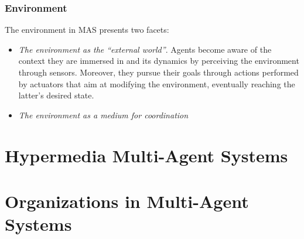 \subsubsection{Environment}
The environment in MAS presents two facets:
\begin{itemize}
    \item \textit{The environment as the ``external world''}.
    Agents become aware of the context they are immersed in and its dynamics by perceiving the environment through sensors.
    Moreover, they pursue their goals through actions performed by actuators that aim at modifying the environment, eventually reaching the latter's desired state.
    \item \textit{The environment as a medium for coordination}
\end{itemize}

\section{Hypermedia Multi-Agent Systems}
\section{Organizations in Multi-Agent Systems}

